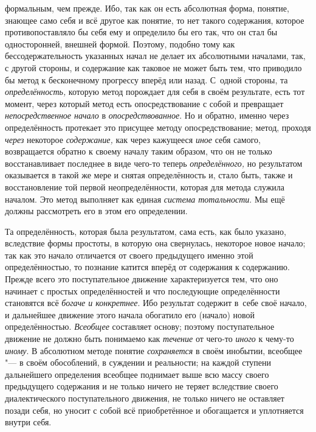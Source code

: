 формальным, чем прежде. Ибо, так как он есть абсолютная форма, понятие,
знающее само себя и всё другое как понятие, то нет такого содержания,
которое противопоставляло бы себя ему и определило бы его так, что он стал
бы односторонней, внешней формой. Поэтому, подобно тому как
бессодержательность указанных начал не делает их абсолютными началами, так,
с другой стороны, и содержание как таковое не может быть
тем, что приводило бы метод к бесконечному прогрессу вперёд или назад.
С~одной стороны, та {\em определённость,}
которую метод порождает для себя в своём результате, есть тот
момент, через который метод есть опосредствование с собой и превращает
{\em непосредственное начало} в {\em опосредствованное}.
Но и обратно, именно через определённость протекает это
присущее методу опосредствование; метод, проходя
{\em через} некоторое {\em содержание,} как через кажущееся {\em иное}
себя самого, возвращается обратно к своему началу таким
образом, что он не только восстанавливает последнее в виде чего-то теперь
{\em определённого,} но
результатом оказывается в такой же мере и снятая определённость и, стало
быть, также и восстановление той первой неопределённости, которая для
метода служила началом. Это метод выполняет как единая
{\em система тотальности}.
Мы ещё должны рассмотреть его в этом его определении.

Та определённость, которая была результатом, сама есть, как
было указано, вследствие формы простоты, в которую она свернулась,
некоторое новое начало; так как это начало отличается от своего предыдущего
именно этой определённостью, то познание катится вперёд от содержания к
содержанию. Прежде всего это поступательное движение характеризуется тем,
что оно начинает с простых определённостей и что последующие определённости
становятся всё {\em богаче и
конкретнее}. Ибо результат содержит в~себе своё начало, и
дальнейшее движение этого начала обогатило его (начало) новой
определённостью. {\em Всеобщее}
составляет основу; поэтому поступательное движение не должно
быть понимаемо как {\em течение} от чего-то {\em иного} к
чему-то {\em иному}. В абсолютном методе понятие {\em сохраняется} в своём
инобытии, всеобщее "--- в своём обособлений, в суждении и
реальности; на каждой ступени дальнейшего определения всеобщее поднимает
выше всю массу своего предыдущего содержания и не только ничего не теряет
вследствие своего диалектического поступательного движения, не только
ничего не оставляет позади себя, но уносит с собой всё приобретённое и
обогащается и уплотняется внутри себя.

